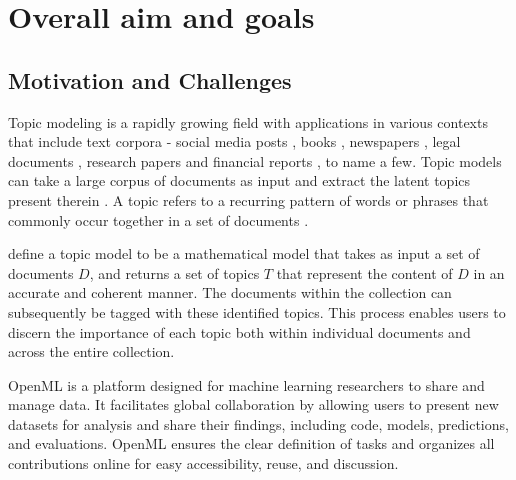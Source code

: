 \documentclass{article}
\begin{document}
\section{Overall aim and goals}
\label{sec:goals}
\subsection{Motivation and Challenges}

Topic modeling is a rapidly growing field with applications in various contexts that include text corpora - social media posts \cite{curiskis_evaluation_2020,paul_discovering_2014,pennacchiotti_investigating_2011}, books \cite{raj_p_m_sentiment_2022}, newspapers \cite{jacobi_quantitative_2018,nicholson_search_2020,marjanen_topic_2020}, legal documents \cite{silveira_topic_nodate,oneill_analysis_2016}, research papers \cite{asmussen_smart_2019} and financial reports \cite{el_mokhtari_using_2020,garcia-mendez_automatic_2023}, to name a few. Topic models can take a large corpus of documents as input and extract the latent topics present therein \cite{blei_latent_2001}. A topic refers to a recurring pattern of words or phrases that commonly occur together in a set of documents \cite{abdelrazek_topic_2022}.

\citet{churchill_evolution_2022} define a topic model to be a mathematical model that takes as input a set of documents $D$, and returns a set of topics $T$ that represent the content of $D$ in an accurate and coherent manner. The documents within the collection can subsequently be tagged with these identified topics. This process enables users to discern the importance of each topic both within individual documents and across the entire collection.

OpenML \cite{vanschoren_openml_2014} is a platform designed for machine learning researchers to share and manage data. It facilitates global collaboration by allowing users to present new datasets for analysis and share their findings, including code, models, predictions, and evaluations. OpenML ensures the clear definition of tasks and organizes all contributions online for easy accessibility, reuse, and discussion.
\end{document}
